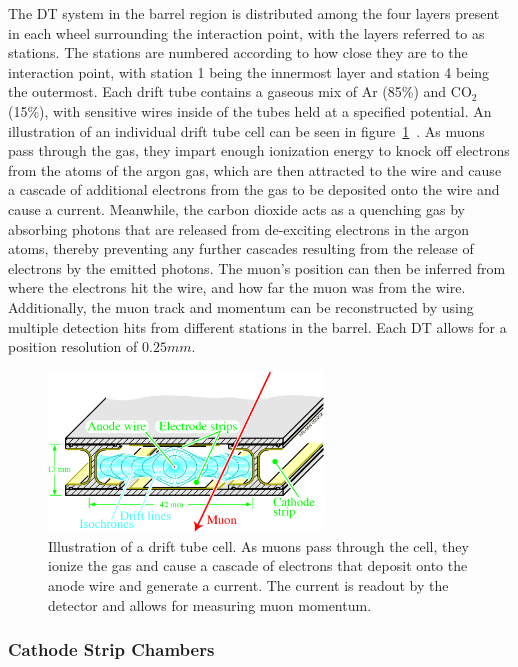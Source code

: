 The DT system in the barrel region is distributed among the four layers present in each wheel surrounding the interaction point, with the layers referred to as stations.
The stations are numbered according to how close they are to the interaction point, with station 1 being the innermost layer and station 4 being the outermost.
Each drift tube contains a gaseous mix of Ar (85\%) and CO$_2$ (15\%), with sensitive wires inside of the tubes held at a specified potential.
An illustration of an individual drift tube cell can be seen in figure~\ref{fig:CMSDTcell}~\cite{Abbiendi_2019}.
As muons pass through the gas, they impart enough ionization energy to knock off electrons from the atoms of the argon gas, which are then attracted to the wire and cause a cascade of additional electrons from the gas to be deposited onto the wire and cause a current.
Meanwhile, the carbon dioxide acts as a quenching gas by absorbing photons that are released from de-exciting electrons in the argon atoms, thereby preventing any further cascades resulting from the release of electrons by the emitted photons.
The muon's position can then be inferred from where the electrons hit the wire, and how far the muon was from the wire.
Additionally, the muon track and momentum can be reconstructed by using multiple detection hits from different stations in the barrel.
Each DT allows for a position resolution of $0.25\unit{mm}$.

\begin{figure}[htbp]
  \centering
  \includegraphics[width=0.65\textwidth]{fig/experiment/cms_DTcell.pdf}
  \caption{
    Illustration of a drift tube cell.
    As muons pass through the cell, they ionize the gas and cause a cascade of electrons that deposit onto the anode wire and generate a current.
    The current is readout by the detector and allows for measuring muon momentum.
  }
  \label{fig:CMSDTcell}
\end{figure}

\subsubsection{Cathode Strip Chambers}

